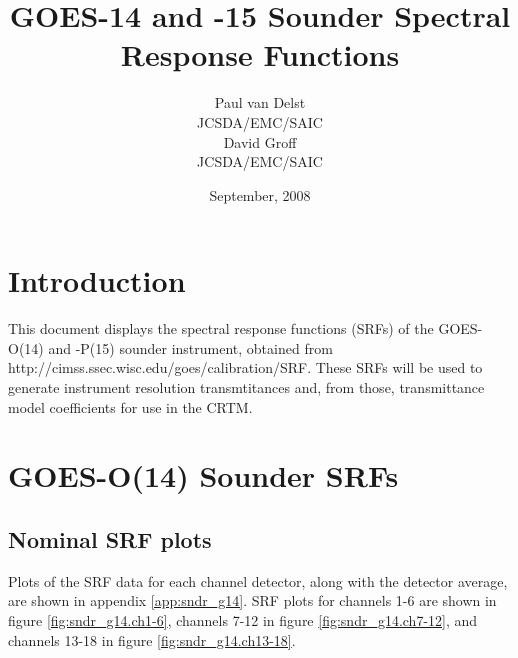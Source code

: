 


\title{GOES-14 and -15 Sounder Spectral Response Functions}
\author{Paul van Delst\\JCSDA/EMC/SAIC\\[0.25in]
        David Groff\\JCSDA/EMC/SAIC}
\date{September, 2008}



\maketitle



\section{Introduction}
This document displays the spectral response functions (SRFs) of the GOES-O(14) and -P(15) sounder instrument, obtained from http://cimss.ssec.wisc.edu/goes/calibration/SRF. These SRFs will be used to generate instrument resolution transmtitances and, from those, transmittance model coefficients for use in the CRTM.


\section{GOES-O(14) Sounder SRFs}

\subsection{Nominal SRF plots}
Plots of the SRF data for each channel detector, along with the detector average, are shown in appendix \ref{app:sndr_g14}. SRF plots for channels 1-6 are shown in figure \ref{fig:sndr_g14.ch1-6}, channels 7-12 in figure \ref{fig:sndr_g14.ch7-12}, and channels 13-18 in figure \ref{fig:sndr_g14.ch13-18}.


